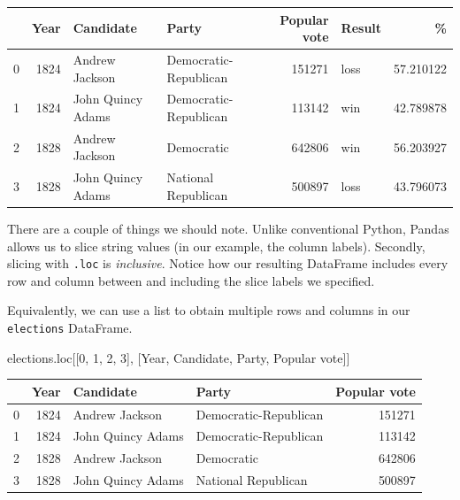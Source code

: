 \documentclass[
  letterpaper,
  DIV=11,
  numbers=noendperiod]{scrreprt}
\newenvironment{Shaded}{\begin{snugshade}}{\end{snugshade}}
\newcommand{\DecValTok}[1]{\textcolor[rgb]{0.68,0.00,0.00}{#1}}
\newcommand{\NormalTok}[1]{\textcolor[rgb]{0.00,0.23,0.31}{#1}}
\newcommand{\StringTok}[1]{\textcolor[rgb]{0.13,0.47,0.30}{#1}}
\begin{document}
\begin{tabular}{lrllrlr}
\toprule
{} &  Year &          Candidate &                  Party &  Popular vote & Result &          \% \\
\midrule
0 &  1824 &     Andrew Jackson &  Democratic-Republican &        151271 &   loss &  57.210122 \\
1 &  1824 &  John Quincy Adams &  Democratic-Republican &        113142 &    win &  42.789878 \\
2 &  1828 &     Andrew Jackson &             Democratic &        642806 &    win &  56.203927 \\
3 &  1828 &  John Quincy Adams &    National Republican &        500897 &   loss &  43.796073 \\
\bottomrule
\end{tabular}

There are a couple of things we should note. Unlike conventional Python,
Pandas allows us to slice string values (in our example, the column
labels). Secondly, slicing with \texttt{.loc} is \emph{inclusive}.
Notice how our resulting DataFrame includes every row and column between
and including the slice labels we specified.

Equivalently, we can use a list to obtain multiple rows and columns in
our \texttt{elections} DataFrame.

\begin{Shaded}
\begin{Highlighting}[]
\NormalTok{elections.loc[[}\DecValTok{0}\NormalTok{, }\DecValTok{1}\NormalTok{, }\DecValTok{2}\NormalTok{, }\DecValTok{3}\NormalTok{], [}\StringTok{\textquotesingle{}Year\textquotesingle{}}\NormalTok{, }\StringTok{\textquotesingle{}Candidate\textquotesingle{}}\NormalTok{, }\StringTok{\textquotesingle{}Party\textquotesingle{}}\NormalTok{, }\StringTok{\textquotesingle{}Popular vote\textquotesingle{}}\NormalTok{]]}
\end{Highlighting}
\end{Shaded}

\begin{tabular}{lrllr}
\toprule
{} &  Year &          Candidate &                  Party &  Popular vote \\
\midrule
0 &  1824 &     Andrew Jackson &  Democratic-Republican &        151271 \\
1 &  1824 &  John Quincy Adams &  Democratic-Republican &        113142 \\
2 &  1828 &     Andrew Jackson &             Democratic &        642806 \\
3 &  1828 &  John Quincy Adams &    National Republican &        500897 \\
\bottomrule
\end{tabular}
\end{document}
